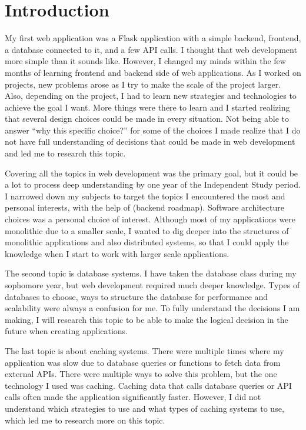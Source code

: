 \chapter{Introduction}\label{intro}

My first web application was a Flask application with a simple backend, frontend, a database connected to it, and a few API calls.
I thought that web development more simple than it sounds like. However, I changed my minds within the few months of learning frontend and backend side of web applications. As I worked on projects, new problems arose as I try to make the scale of the project larger. Also, depending on the project, I had to learn new strategies and technologies to achieve the goal I want. More things were there to learn and I started realizing that several design choices could be made in every situation. Not being able to answer “why this specific choice?” for some of the choices I made realize that I do not have full understanding of decisions that could be made in web development and led me to research this topic. 

Covering all the topics in web development was the primary goal, but it could be a lot to process deep understanding by one year of the Independent Study period. I narrowed down my subjects to target the topics I encountered the most and personal interests, with the help of (backend roadmap). Software architecture choices was a personal choice of interest. Although most of my applications were monolithic due to a smaller scale, I wanted to dig deeper into the structures of monolithic applications and also distributed systems, so that I could apply the knowledge when I start to work with larger scale applications.

The second topic is database systems. I have taken the database class during my sophomore year, but web development required much deeper knowledge. Types of databases to choose, ways to structure the database for performance and scalability were always a confusion for me. To fully understand the decisions I am making, I will research this topic to be able to make the logical decision in the future when creating applications.

The last topic is about caching systems. There were multiple times where my application was slow due to database queries or functions to fetch data from external APIs. There were multiple ways to solve this problem, but the one technology I used was caching. Caching data that calls database queries or API calls often made the application significantly faster. However, I did not understand which strategies to use and what types of caching systems to use, which led me to research more on this topic. 

